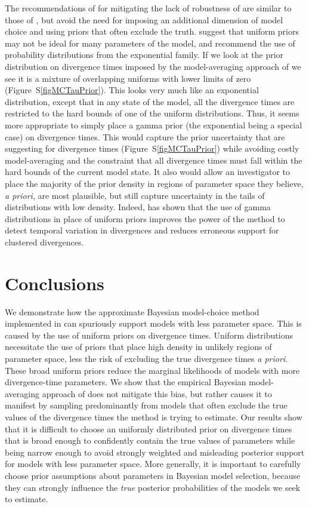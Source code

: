 The recommendations of \citet{Oaks2012} for mitigating the lack of robustness
of \msb are similar to those of \citet{Hickerson2013}, but avoid the need for
imposing an additional dimension of model choice and using priors that often
exclude the truth.
\citet{Oaks2012} suggest that uniform priors may not be ideal for many
parameters of the \msb model, and recommend the use of probability
distributions from the exponential family.
If we look at the prior distribution on divergence times imposed by
the model-averaging approach of \citet{Hickerson2013} we see it is a mixture of
overlapping uniforms with lower limits of zero (Figure~S\ref{figMCTauPrior}).
This looks very much like an exponential distribution, except that in any state
of the model, all the divergence times are restricted to the hard
bounds of one of the uniform distributions.
Thus, it seems more appropriate to simply place a gamma prior (the exponential
being a special case) on divergence times.
This would capture the prior uncertainty that \citet{Hickerson2013} are
suggesting for divergence times (Figure~S\ref{figMCTauPrior}) while avoiding
costly model-averaging and the constraint that all divergence times must fall
within the hard bounds of the current model state.
It also would allow an investigator to place the majority of the prior density
in regions of parameter space they believe, \emph{a priori}, are most
plausible, but still capture uncertainty in the tails of distributions with low
density.
Indeed, \citet{Oaks2014dpp} has shown that the use of gamma distributions in
place of uniform priors improves the power of the method to detect temporal
variation in divergences and reduces erroneous support for clustered
divergences.


\section{Conclusions}
We demonstrate how the approximate Bayesian model-choice method implemented in
\msb can spuriously support models with less parameter space.
This is caused by the use of uniform priors on divergence times.
Uniform distributions necessitate the use of priors that place high density in
unlikely regions of parameter space, less the risk of excluding the true
divergence times \emph{a priori}.
These broad uniform priors reduce the marginal likelihoods of models with more
divergence-time parameters.
We show that the empirical Bayesian model-averaging approach of
\citet{Hickerson2013} does not mitigate this bias, but rather causes it to
manifest by sampling predominantly from models that often exclude the true
values of the divergence times the method is trying to estimate.
Our results show that it is difficult to choose an uniformly distributed prior
on divergence times that is broad enough to confidently contain the true values
of parameters while being narrow enough to avoid strongly weighted and
misleading posterior support for models with less parameter space.
More generally, it is important to carefully choose prior assumptions about
parameters in Bayesian model selection, because they can strongly influence the
\emph{true} posterior probabilities of the models we seek to estimate.

